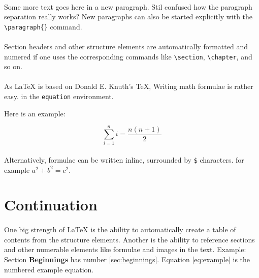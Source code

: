 \documentclass{article}
\begin{document}
\paragraph{} Some more text goes here in a new paragraph.
Stil confused how the paragraph separation really works?
New paragraphs can also be started explicitly with the \verb|\paragraph{}| command.



\paragraph{} Section headers and other structure elements are automatically formatted and numered
if one uses the corresponding commands like \verb|\section|, \verb|\chapter|, and
so on.


\paragraph{} As {\LaTeX} is based on Donald E. Knuth's {\TeX},
Writing math formulae is rather easy. in the \verb+equation+ environment.

Here is an example:


\begin{equation}
\label{eq:example}
\sum_{i=1}^{n}i = \frac{n(n+1)}{2}
\end{equation}

\paragraph{} Alternatively, formulae can be written inline, surrounded
by \verb|$| characters. for example $a^2 + b^2 = c^2$.

\section{Continuation}

\paragraph{}One big strength of {\LaTeX} is the ability to automatically create a table of contents from the
structure elements. Another is the ability to reference  sections and other numerable elements like formulae
and images in the text. Example: Section \textbf{Beginnings} has number \ref{sec:beginnings}.
Equation \ref{eq:example} is the numbered example equation.
\end{document}

